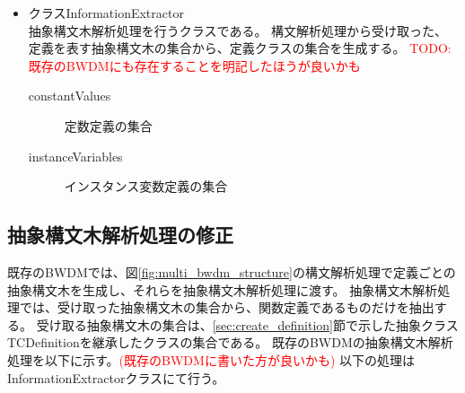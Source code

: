 \documentclass[uplatex, report, a4j, 10pt]{jsbook}
\newcommand\todo[1]{\textcolor{red}{#1}}
\begin{document}
\begin{itemize}
  \item クラスInformationExtractor\\
        抽象構文木解析処理を行うクラスである。
        構文解析処理から受け取った、定義を表す抽象構文木の集合から、定義クラスの集合を生成する。
        \todo{TODO: 既存のBWDMにも存在することを明記したほうが良いかも}
        \begin{description}
          \item[constantValues] 定数定義の集合
          \item[instanceVariables] インスタンス変数定義の集合
        \end{description}

\end{itemize}

\subsection{抽象構文木解析処理の修正}

既存のBWDMでは、図\ref{fig:multi_bwdm_structure}の構文解析処理で定義ごとの抽象構文木を生成し、それらを抽象構文木解析処理に渡す。
抽象構文木解析処理では、受け取った抽象構文木の集合から、関数定義であるものだけを抽出する。
受け取る抽象構文木の集合は、\ref{sec:create_definition}節で示した抽象クラスTCDefinitionを継承したクラスの集合である。
既存のBWDMの抽象構文木解析処理を以下に示す。\todo{(既存のBWDMに書いた方が良いかも)}
以下の処理はInformationExtractorクラスにて行う。
\end{document}
